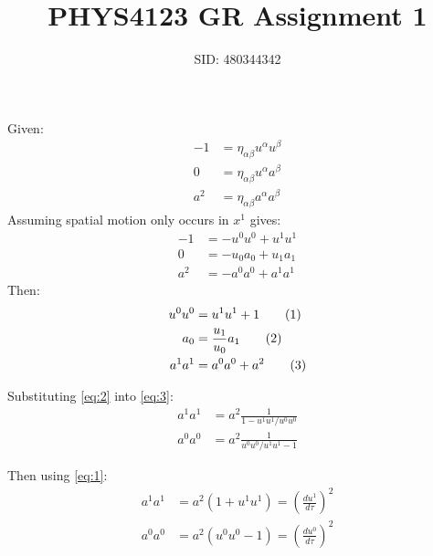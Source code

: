 \documentclass[a4paper]{article}
\title{PHYS4123 GR Assignment 1}
\author{SID: 480344342}
\newcommand{\horln}{\vspace{-6mm}\begin{flushleft}\mbox{}\hrulefill\mbox{}
	\end{flushleft}\vspace{-6mm}}
\newcommand\eq{\addtocounter{equation}{1}\tag{\theequation}}
\begin{document}

\maketitle
\horln

\setcounter{page}{1}


\section{}
\subsection{}
Given:
\begin{align*}-1 &= \eta_{\alpha \beta} u^\alpha u^\beta\\
0 &= \eta_{\alpha \beta} u^\alpha a^\beta \\
a^2 &= \eta_{\alpha \beta} a^\alpha a^\beta
\end{align*}
Assuming spatial motion only occurs in $x^1$ gives:
\begin{align*}
-1 &= -u^0u^0 + u^1u^1\\
0 &= -u_0a_0 + u_1 a_1\\
a^2 &= -a^0a^0 + a^1a^1
\end{align*}
Then:
\begin{align*}
u^0u^0 &= u^1u^1 + 1 \eq \label{eq:1}\\
a_0 &= \frac{u_1}{u_0} a_1 \eq \label{eq:2}\\
a^1a^1 &= a^0a^0 + a^2 \eq \label{eq:3}
\end{align*}

Substituting \eqref{eq:2} into \eqref{eq:3}:
\begin{align*}
a^1a^1 &= a^2 \frac{1}{1-u^1u^1/u^0u^0}\\
a^0a^0 &= a^2 \frac{1}{u^0u^0/u^1u^1 - 1}
\end{align*}

Then using \eqref{eq:1}:
\begin{align*}
a^1a^1 &= a^2 (1 + u^1 u^1) = \left(\frac{du^1}{d\tau}\right)^2\\
a^0a^0 &=  a^2 (u^0 u^0 - 1) =  \left(\frac{du^0}{d\tau}\right)^2
\end{align*}
\end{document}
